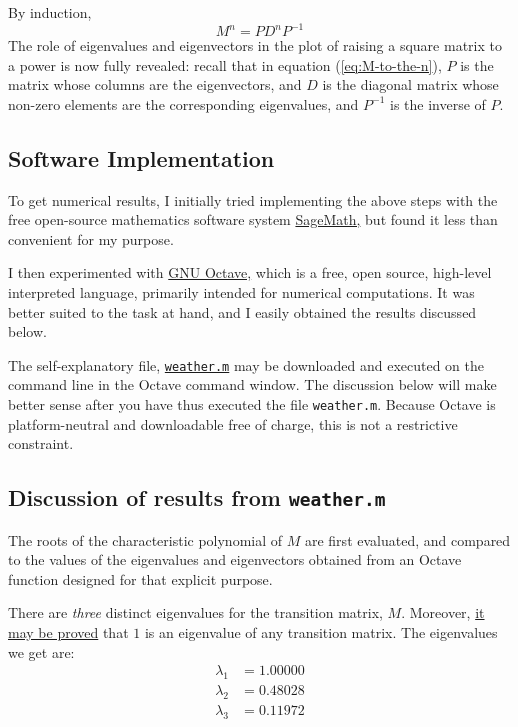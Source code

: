 \documentclass[
  12pt,
  a4paper,
]{article}
\begin{document}
By induction, \begin{equation}
M^{n} = PD^{n}P^{-1}
\label{eq:M-to-the-n}\end{equation} The role of eigenvalues and
eigenvectors in the plot of raising a square matrix to a power is now
fully revealed: recall that in equation (\ref{eq:M-to-the-n}), \(P\) is
the matrix whose columns are the eigenvectors, and \(D\) is the diagonal
matrix whose non-zero elements are the corresponding eigenvalues, and
\(P^{-1}\) is the inverse of \(P\).

\hypertarget{software-implementation}{%
\subsection{Software Implementation}\label{software-implementation}}

To get numerical results, I initially tried implementing the above steps
with the free open-source mathematics software system
\href{http://www.sagemath.org/}{SageMath,} but found it less than
convenient for my purpose.

I then experimented with \href{https://www.gnu.org/software/octave/}{GNU
Octave,} which is a free, open source, high-level interpreted language,
primarily intended for numerical computations. It was better suited to
the task at hand, and I easily obtained the results discussed below.

The self-explanatory file,
\href{http://swanlotus.org/wp-content/uploads/weather.m}{\texttt{weather.m}}
may be downloaded and executed on the command line in the Octave command
window. The discussion below will make better sense after you have thus
executed the file \texttt{weather.m}. Because Octave is platform-neutral
and downloadable free of charge, this is not a restrictive constraint.

\hypertarget{discussion-of-results-from-weather.m}{%
\subsection{\texorpdfstring{Discussion of results from
\texttt{weather.m}}{Discussion of results from weather.m}}\label{discussion-of-results-from-weather.m}}

The roots of the characteristic polynomial of \(M\) are first evaluated,
and compared to the values of the eigenvalues and eigenvectors obtained
from an Octave function designed for that explicit purpose.

There are \emph{three} distinct eigenvalues for the transition matrix,
\(M\). Moreover,
\href{http://www.math.cornell.edu/~mec/Winter2009/RalucaRemus/Lecture1/lecture1.html}{it
may be proved} that \(1\) is an eigenvalue of any transition matrix. The
eigenvalues we get are: \[
\begin{aligned}
\lambda_{1} &= 1.00000\\
\lambda_{2} &= 0.48028\\
\lambda_{3} &= 0.11972
\end{aligned}
\]
\end{document}
